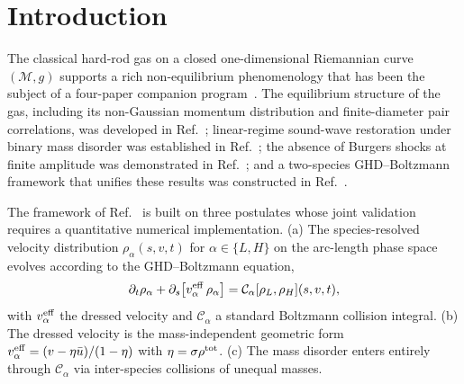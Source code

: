 \documentclass[aps,pre,twocolumn,superscriptaddress,longbibliography,floatfix]{revtex4-2}
\begin{document}
\section{Introduction}\label{sec:intro}

The classical hard-rod gas on a closed one-dimensional
Riemannian curve $(\mathcal{M},g)$ supports a rich
non-equilibrium phenomenology that has been the subject of a
four-paper companion program~\cite{PaperI,PaperII,PaperIII,
PaperIV}. The equilibrium structure of the gas, including its
non-Gaussian momentum distribution and finite-diameter pair
correlations, was developed in Ref.~\cite{PaperI};
linear-regime sound-wave restoration under binary mass disorder
was established in Ref.~\cite{PaperII}; the absence of Burgers
shocks at finite amplitude was demonstrated in
Ref.~\cite{PaperIII}; and a two-species GHD--Boltzmann
framework that unifies these results was constructed in
Ref.~\cite{PaperIV}.

The framework of Ref.~\cite{PaperIV} is built on three
postulates whose joint validation requires a quantitative
numerical implementation. (a) The species-resolved velocity
distribution $\rho_\alpha(s,v,t)$ for
$\alpha\in\{L,H\}$ on the arc-length phase space evolves
according to the GHD--Boltzmann equation,
\begin{equation}
\partial_t \rho_\alpha
+ \partial_s\!\left[v^{\rm eff}_\alpha\,\rho_\alpha\right]
= \mathcal{C}_\alpha[\rho_L,\rho_H](s,v,t),
\label{eq:ghdb}
\end{equation}
with $v^{\rm eff}_\alpha$ the dressed velocity and
$\mathcal{C}_\alpha$ a standard Boltzmann collision integral.
(b) The dressed velocity is the mass-independent geometric form
$v^{\rm eff}_\alpha = (v-\eta\bar u)/(1-\eta)$ with
$\eta=\sigma\rho^{\rm tot}$.
(c) The mass disorder enters entirely through
$\mathcal{C}_\alpha$ via inter-species collisions of unequal
masses.
\end{document}
